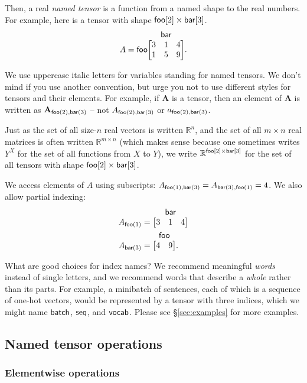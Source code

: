 \documentclass{article}
\makeatletter
\newcommand{\nmatrix}[3]{\name{#1}\begin{array}[b]{@{}c@{}}\name{#2}\\\begin{bmatrix}#3\end{bmatrix}\end{array}}
\makeatother
\begin{document}
Then, a real \emph{named tensor} is a function from a named shape to the real numbers. For example, here is a tensor with shape $\mathsf{foo}[2] \times \mathsf{bar}[3]$.
\begin{equation*}
A = \nmatrix{foo}{bar}{
  3 & 1 & 4 \\
  1 & 5 & 9
}.
\end{equation*}

We use uppercase italic letters for variables standing for named tensors. We don't mind if you use another convention, but urge you not to use different styles for tensors and their elements. For example, if $\mathbf{A}$ is a tensor, then an element of $\mathbf{A}$ is written as $\mathbf{A}_{\mathsf{foo}(2), \mathsf{bar}(3)}$ -- 
not $A_{\mathsf{foo}(2),\mathsf{bar}(3)}$ or $a_{\mathsf{foo}(2),\mathsf{bar}(3)}$.

Just as the set of all size-$n$ real vectors is written $\mathbb{R}^n$, and the set of all $m\times n$ real matrices is often written $\mathbb{R}^{m \times n}$ (which makes sense because one sometimes writes $Y^X$ for the set of all functions from $X$ to $Y$), we write $\mathbb{R}^{\mathsf{foo}[2] \times \mathsf{bar}[3]}$ for the set of all tensors with shape $\mathsf{foo}[2] \times \mathsf{bar}[3]$.

We access elements of $A$ using subscripts: $A_{\mathsf{foo}(1), \mathsf{bar}(3)} = A_{\mathsf{bar}(3), \mathsf{foo}(1)} = 4$.
We also allow partial indexing:
\begin{align*}
A_{\nidx{foo}{1}} &= \nmatrix{}{bar}{
  3 & 1 & 4
}
\\
A_{\nidx{bar}{3}} &= \nmatrix{}{foo}{
  4 & 9
}.
\end{align*}

What are good choices for index names? We recommend meaningful \emph{words} instead of single letters, and we recommend words that describe a \emph{whole} rather than its parts. For example, a minibatch of sentences, each of which is a sequence of one-hot vectors, would be represented by a tensor with three indices, which we might name $\mathsf{batch}$, $\mathsf{seq}$, and $\mathsf{vocab}$. Please see \S\ref{sec:examples} for more examples.

\subsection{Named tensor operations}
\label{sec:operations}

\subsubsection{Elementwise operations}
\end{document}
